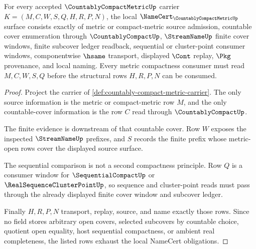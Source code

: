 \begin{theorem}
\label{thm:countably-compact-metric-namecert-obligations}
For every accepted $\CountablyCompactMetricUp$ carrier $K=(M,C,W,S,Q,H,R,P,N)$, the local $\NameCert_{\CountablyCompactMetricUp}$ surface consists exactly of metric or compact-metric source admission, countable cover enumeration through $\CountablyCompactUp$, $\StreamNameUp$ finite cover windows, finite subcover ledger readback, sequential or cluster-point consumer windows, componentwise $\hsame$ transport, displayed $\Cont$ replay, $\Pkg$ provenance, and local naming. Every metric compactness consumer must read $M,C,W,S,Q$ before the structural rows $H,R,P,N$ can be consumed.
\end{theorem}
\begin{proof}
Project the carrier of \autoref{def:countably-compact-metric-carrier}. The only source information is the metric or compact-metric row $M$, and the only countable-cover information is the row $C$ read through $\CountablyCompactUp$.

The finite evidence is downstream of that countable cover. Row $W$ exposes the inspected $\StreamNameUp$ prefixes, and $S$ records the finite prefix whose metric-open rows cover the displayed source surface.

The sequential comparison is not a second compactness principle. Row $Q$ is a consumer window for $\SequentialCompactUp$ or $\RealSequenceClusterPointUp$, so sequence and cluster-point reads must pass through the already displayed finite cover window and subcover ledger.

Finally $H,R,P,N$ transport, replay, source, and name exactly those rows. Since no field stores arbitrary open covers, selected subcovers by countable choice, quotient open equality, host sequential compactness, or ambient real completeness, the listed rows exhaust the local NameCert obligations.
\end{proof}


